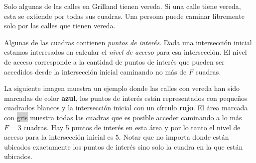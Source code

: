 \documentclass{oci}
\begin{document}
\begin{problemDescription}
  Solo algunas de las calles en Grilland tienen vereda.
  Si una calle tiene vereda, esta se extiende por todas sus cuadras.
  Una persona puede caminar libremente solo por las calles que tienen vereda.

  Algunas de las cuadras contienen \emph{puntos de interés}.
  Dada una intersección inicial estamos interesados en calcular el \emph{nivel de acceso} para
  esa intersección.
  El nivel de acceso corresponde a la cantidad de puntos de interés que pueden ser accedidos
  desde la intersección inicial caminando no más de $F$ cuadras.

  La siguiente imagen muestra un ejemplo donde las calles con vereda han sido marcadas de color
  {\bf\color{blue}azul}, los puntos de interés están representados con pequeños cuadrados blancos
  y la intersección inicial con un círculo {\bf\color{red}rojo}.
  El área marcada con \colorbox{lightgray}{gris} muestra todas las cuadras que es posible acceder
  caminando a lo más $F=3$ cuadras.
  Hay 5 puntos de interés en esta área y por lo tanto el nivel de acceso para la intersección
  inicial es 5.
  Notar que no importa donde están ubicados exactamente los puntos de interés sino solo la cuadra
  en la que están ubicados.

  \begin{center}
\end{center}
\end{problemDescription}
\end{document}
